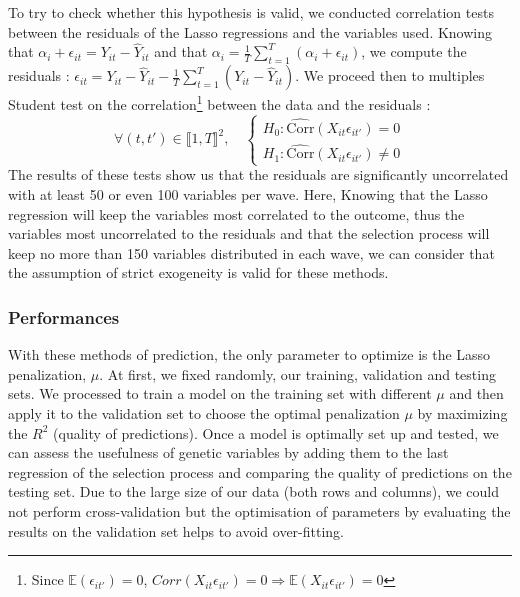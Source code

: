 \documentclass[]{article}
\begin{document}
\noindent
To try to check whether this hypothesis is valid, we conducted correlation tests between the residuals of the Lasso regressions and the variables used. Knowing that $\alpha_i + \epsilon_{it} = {Y}_{it} - \hat{Y}_{it}$ and that $\alpha_i = \frac{1}{T} \sum_{t=1}^T (\alpha_i + \epsilon_{it} )$, we compute the residuals : $\epsilon_{it} = {Y}_{it} - \hat{Y}_{it} - \frac{1}{T} \sum_{t=1}^T ({Y}_{it} - \hat{Y}_{it} )$. We proceed then to multiples Student test on the correlation\footnote{Since $\mathbb{E}(\epsilon_{it'}) = 0$, $Corr(X_{it}\epsilon_{it'}) = 0 \Longrightarrow \mathbb{E}(X_{it}\epsilon_{it'}) = 0$} between the data and the residuals : 
\begin{equation}
	\forall (t,t')\in \llbracket1,T\rrbracket^2,\quad \left\{
	\begin{array}{ll}
		H_0 : \widehat{\mathrm{Corr}}(X_{it}\epsilon_{it'}) = 0\\
		H_1 : \widehat{\mathrm{Corr}}(X_{it}\epsilon_{it'}) \ne 0
	\end{array}
	\right.
\end{equation}
The results of these tests show us that the residuals are significantly uncorrelated with at least 50 or even 100 variables per wave. Here, Knowing that the Lasso regression will keep the variables most correlated to the outcome, thus the variables most uncorrelated to the residuals and that the selection process will keep no more than 150 variables distributed in each wave, we can consider that the assumption of strict exogeneity is valid for these methods.

\subsubsection{Performances}


With these methods of prediction, the only parameter to optimize is the Lasso penalization, $\mu$. At first, we fixed randomly, our training, validation and testing sets. We processed to train a model on the training set with different $\mu$ and then apply it to the validation set to choose the optimal penalization $\mu$ by maximizing the $R^2$ (quality of predictions). Once a model is optimally set up and tested, we can assess the usefulness of genetic variables by adding them to the last regression of the selection process and comparing the quality of predictions on the testing set. Due to the large size of our data (both rows and columns), we could not perform cross-validation but the optimisation of parameters by evaluating the results on the validation set helps to avoid over-fitting.\\
\end{document}
